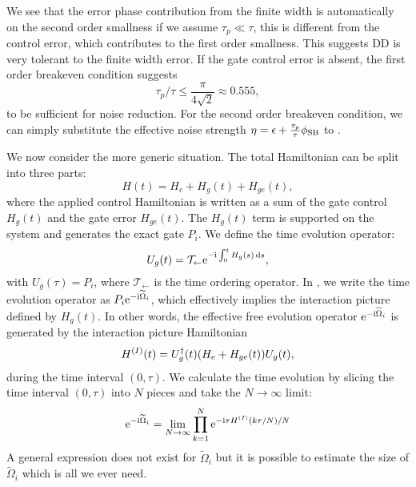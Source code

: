 \documentclass[pra,reprint,superscriptaddress]{revtex4-2}
\newcommand{\wt}[1]{\widetilde{#1}}
\begin{document}
We see that the error phase contribution from the finite width is automatically on the second order smallness if we assume $\tau_p\ll \tau$, this is different from the control error, which contributes to the first order smallness. 
This suggests DD is very tolerant to the finite width error. If the gate control error is absent, the first order breakeven condition suggests
\begin{equation}
 \tau_p/\tau \le \frac{\pi}{4\sqrt{2}}\approx 0.555,
\end{equation}
to be sufficient for noise reduction.
For the second order breakeven condition, we can simply substitute the effective noise strength $\eta = \epsilon + \frac{\tau_p}{\tau}\phi_{\mathrm{SB}}$ to .


We now consider the more generic situation. The total Hamiltonian can be split into three parts:
\begin{equation}
 H(t)= H_e + H_g(t) + H_{ge}(t),
\end{equation}
where the applied control Hamiltonian is
written as a sum of the gate control $H_g(t)$ and the gate error $H_{ge}(t)$. The $H_g(t)$  term is supported on the system and generates the exact gate $P_i$. We define the time evolution operator:
\begin{equation}
U_g(t) = \mathcal{T}_\leftarrow \mathrm{e}^{-\mathrm{i} \int_{0}^{t} H_g(s) \mathop{}\!\mathrm{d} s},
\end{equation}
with $U_g(\tau)= P_i$, where $ \mathcal{T}_\leftarrow$ is the time ordering operator. In , we
write the time evolution operator as $P_i \upe^{-\upi \wt \Omega_i}$, which effectively implies the interaction picture defined by $H_g(t)$. In other words,  the effective free evolution operator $\upe^{-\upi \wt \Omega_i}$  is generated by the interaction picture Hamiltonian 
\begin{equation}
H^{(I)}(t)=U_g^\dagger(t) (H_e + H_{ge} (t)) U_g(t),
\end{equation}
during the time interval $(0,\tau)$.
We calculate the time evolution by slicing the time interval $(0,\tau)$ into $N$ pieces and take the $N\to\infty$ limit:
\begin{equation}
 \upe^{-\upi \wt \Omega_i} = \lim_{N\to\infty} \prod_{k=1}^N 
 \upe^{-\upi \tau H\up{I}(k \tau/N)/N}
\end{equation}
A general expression does not exist for $\wt \Omega_i$ but it is possible to estimate the size of $\wt \Omega_i$ which is all we ever need. 
\end{document}

